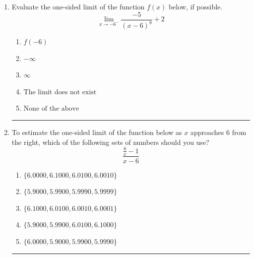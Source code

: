 \documentclass[14pt]{extbook}
\newcommand{\litem}[1]{\item#1\hspace*{-1cm}\rule{\textwidth}{0.4pt}}
\begin{document}
\begin{enumerate}
{\begin{enumerate}[label=\Alph*.]
\end{enumerate} }
\litem{
Evaluate the one-sided limit of the function $f(x)$ below, if possible.\[ \lim_{x \rightarrow -6^-} \frac{-5}{(x-6)^8}+2 \]\begin{enumerate}[label=\Alph*.]
\item \( f(-6) \)
\item \( -\infty \)
\item \( \infty \)
\item \( \text{The limit does not exist} \)
\item \( \text{None of the above} \)

\end{enumerate} }
\litem{
To estimate the one-sided limit of the function below as $x$ approaches 6 from the right, which of the following sets of numbers should you use?\[ \frac{\frac{6}{x} - 1}{x - 6} \]\begin{enumerate}[label=\Alph*.]
\item \( \{ 6.0000, 6.1000, 6.0100, 6.0010 \} \)
\item \( \{ 5.9000, 5.9900, 5.9990, 5.9999 \} \)
\item \( \{ 6.1000, 6.0100, 6.0010, 6.0001 \} \)
\item \( \{ 5.9000, 5.9900, 6.0100, 6.1000 \} \)
\item \( \{ 6.0000, 5.9000, 5.9900, 5.9990 \} \)

\end{enumerate} }
\end{enumerate}
\end{document}
